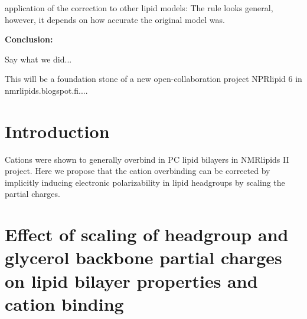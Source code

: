 \documentclass[aip,jcp]{revtex4}
\begin{document}
application of the correction to other lipid models: The rule looks general, however, it depends on how accurate the original model was.

\textbf{Conclusion:}

Say what we did...

This will be a foundation stone of a new open-collaboration project NPRlipid 6 in nmrlipids.blogspot.fi....






\section{Introduction}

Cations were shown to generally overbind in PC lipid bilayers in
NMRlipids II project. Here we propose that the cation overbinding can
be corrected by implicitly inducing electronic polarizability in
lipid headgroups by scaling the partial charges.



\section{Effect of scaling of headgroup and glycerol backbone partial charges on lipid bilayer properties and cation binding}
\end{document}
